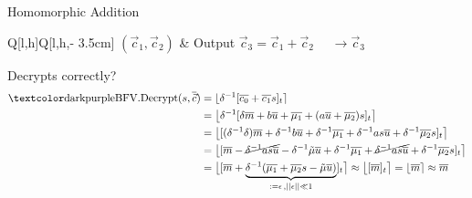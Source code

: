 \documentclass[aspectratio=169]{beamer}
\begin{document}
  \begin{frame}{Homomorphic Addition}
    \begin{tblr}{Q[l,h]Q[l,h,\textwidth - 3.5cm]}
      $(\vec{c}_1, \vec{c}_2)$ & {
          Output $\vec{c}_3 = \vec{c}_1 + \vec{c}_2$
          $\quad\rightarrow \vec{c}_3$} \\
    \end{tblr}

    Decrypts correctly?
    \begin{align*}
      \cryptop{BFV.Decrypt}(s, \overline{\vec{c}})
       & = \lfloor \delta\inv [\overline{c_0} + \overline{c_1} s]_t \rceil                                                                                                                                                         \\
       & = \big\lfloor \delta\inv [\delta \overline{m} + b \overline{u} + \overline{\mu_1} + (a \overline{u} + \overline{\mu_2}) s]_t \big\rceil                                                                                   \\
       & = \big\lfloor [(\delta\inv\delta) \overline{m} + \delta\inv b \overline{u} + \delta\inv \overline{\mu_1} + \delta\inv a s \overline{u} + \delta\inv \overline{\mu_2} s]_t \big\rceil                                      \\
       & = \big\lfloor [\overline{m} - \cancel{\delta\inv as \overline{u}} - \delta\inv \tilde{\mu} \overline{u} + \delta\inv \overline{\mu_1} + \cancel{\delta\inv as \overline{u}} + \delta\inv \overline{\mu_2} s]_t \big\rceil \\
       & = \big\lfloor [\overline{m} + \underbrace{\delta\inv (\overline{\mu_1} + \overline{\mu_2} s - \tilde{\mu} \overline{u})}_{:= \epsilon \,, ||\epsilon|| \ll 1}]_t \big\rceil
      \approx \big\lfloor [\overline{m}]_t \big\rceil = \lfloor \overline{m} \rceil \approx \overline{m}
    \end{align*}
  \end{frame}
\end{document}
